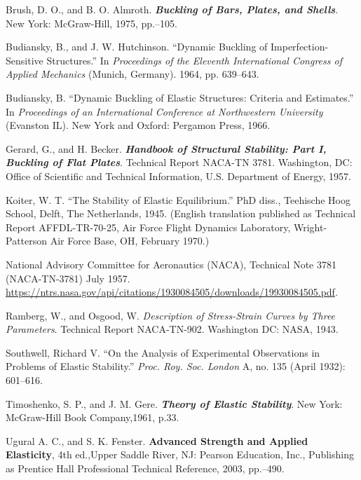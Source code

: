 \documentclass{AeroStructure-ERJohnson}
\begin{document}
\begin{thebibliography}{}\label{sec11.10}
\bibitem{} Brush, D. O., and B. O. Almroth. \textit{\textbf{Buckling of Bars, Plates, and Shells}}. New York: McGraw-Hill, 1975, pp.--105.

\bibitem{} Budiansky, B., and J. W. Hutchinson. ``Dynamic Buckling of Imperfection-Sensitive Structures.'' In \textit{Proceedings of the Eleventh International Congress of Applied Mechanics} (Munich, Germany). 1964, pp. 639--643.

\bibitem{} Budiansky, B. ``Dynamic Buckling of Elastic Structures: Criteria and Estimates.'' In \textit{Proceedings of an International Conference at Northwestern University} (Evanston IL). New York and Oxford: Pergamon Press, 1966.

\bibitem{} Gerard, G., and H. Becker. \textit{\textbf{Handbook of Structural Stability: Part I, Buckling of Flat Plates}}. Technical Report NACA-TN 3781. Washington, DC: Office of Scientific and Technical Information, U.S. Department of Energy, 1957.

\bibitem{} Koiter, W. T. ``The Stability of Elastic Equilibrium.'' PhD diss., Teehische Hoog School, Delft, The Netherlands, 1945. (English translation published as Technical Report AFFDL-TR-70-25, Air Force Flight Dynamics Laboratory, Wright-Patterson Air Force Base, OH, February 1970.)

\bibitem{} National Advisory Committee for Aeronautics (NACA), Technical Note 3781 (NACA-TN-3781) July 1957. \url{https://ntrs.nasa.gov/api/citations/1930084505/downloads/19930084505.pdf}.

\bibitem{} Ramberg, W., and Osgood, W. \textit{Description of Stress-Strain Curves by Three Parameters}. Technical Report NACA-TN-902. Washington DC: NASA, 1943.

\bibitem{} Southwell, Richard V. ``On the Analysis of Experimental Observations in Problems of Elastic Stability.'' \textit{Proc. Roy. Soc. London} A, no. 135 (April 1932): 601--616.

\bibitem{} Timoshenko, S. P., and J. M. Gere. \textit{\textbf{Theory of Elastic Stability}}. New York: McGraw-Hill Book Company,1961, p.33.

\bibitem{} Ugural A. C., and S. K. Fenster. \textbf{Advanced Strength and Applied Elasticity}, 4th ed.,Upper Saddle River, NJ: Pearson Education, Inc., Publishing as Prentice Hall Professional Technical Reference, 2003, pp.--490.
\end{thebibliography}
\end{document}
